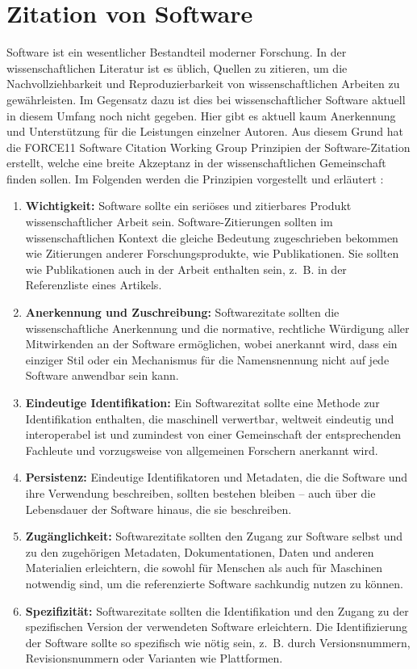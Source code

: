 \section{Zitation von Software}
\label{sec:software-zitation}
Software ist ein wesentlicher Bestandteil moderner Forschung.
In der wissenschaftlichen Literatur ist es üblich, Quellen zu zitieren, um die Nachvollziehbarkeit und Reproduzierbarkeit von wissenschaftlichen Arbeiten zu gewährleisten.
Im Gegensatz dazu ist dies bei wissenschaftlicher Software aktuell in diesem Umfang noch nicht gegeben.
Hier gibt es aktuell kaum Anerkennung und Unterstützung für die Leistungen einzelner Autoren.
Aus diesem Grund hat die \glqq FORCE11 Software Citation Working Group\grqq{} Prinzipien der Software-Zitation erstellt, welche eine breite Akzeptanz in der wissenschaftlichen Gemeinschaft finden sollen.
Im Folgenden werden die Prinzipien vorgestellt und erläutert \autocite{smith_software_2016}:

\begin{enumerate}
    \item \textbf{Wichtigkeit:} Software sollte ein seriöses und zitierbares Produkt wissenschaftlicher Arbeit sein. Software-Zitierungen sollten im wissenschaftlichen Kontext die gleiche Bedeutung zugeschrieben bekommen wie Zitierungen anderer Forschungsprodukte, wie Publikationen. Sie sollten wie Publikationen auch in der Arbeit enthalten sein, z. B. in der Referenzliste eines Artikels.
    \item \textbf{Anerkennung und Zuschreibung:} Softwarezitate sollten die wissenschaftliche Anerkennung und die normative, rechtliche Würdigung aller Mitwirkenden an der Software ermöglichen, wobei anerkannt wird, dass ein einziger Stil oder ein Mechanismus für die Namensnennung nicht auf jede Software anwendbar sein kann.
    \item \textbf{Eindeutige Identifikation:} Ein Softwarezitat sollte eine Methode zur Identifikation enthalten, die maschinell verwertbar, weltweit eindeutig und interoperabel ist und zumindest von einer Gemeinschaft der entsprechenden Fachleute und vorzugsweise von allgemeinen Forschern anerkannt wird.
    \item \textbf{Persistenz:} Eindeutige Identifikatoren und Metadaten, die die Software und ihre Verwendung beschreiben, sollten bestehen bleiben – auch über die Lebensdauer der Software hinaus, die sie beschreiben.
    \item \textbf{Zugänglichkeit:} Softwarezitate sollten den Zugang zur Software selbst und zu den zugehörigen Metadaten, Dokumentationen, Daten und anderen Materialien erleichtern, die sowohl für Menschen als auch für Maschinen notwendig sind, um die referenzierte Software sachkundig nutzen zu können.
    \item \textbf{Spezifizität:} Softwarezitate sollten die Identifikation und den Zugang zu der spezifischen Version der verwendeten Software erleichtern. Die Identifizierung der Software sollte so spezifisch wie nötig sein, z. B. durch Versionsnummern, Revisionsnummern oder Varianten wie Plattformen.
\end{enumerate}

